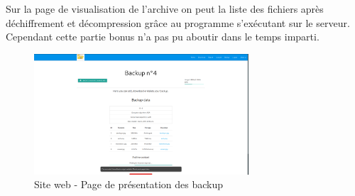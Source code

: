 	\newpage
	
	Sur la page de visualisation de l'archive on peut la liste des fichiers après déchiffrement et décompression grâce au programme s'exécutant sur le serveur. Cependant cette partie bonus n'a pas pu aboutir dans le temps imparti.
	\begin{figure}[!h]
		\centering
		\includegraphics[width=8cm]{images/website_backup.png}
		\caption{Site web - Page de présentation des backup}
		\label{Site web - Page de présentation des backup}
	\end{figure}
	
\newpage
